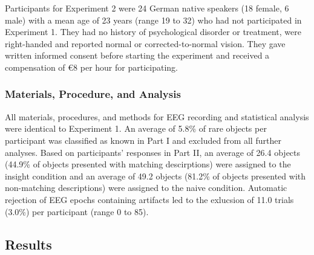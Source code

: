 \documentclass[
  english,
  man,11pt,floatsintext]{apa7}
\begin{document}
Participants for Experiment 2 were 24 German native speakers (18 female, 6 male) with a mean age of 23 years (range 19 to 32) who had not participated in Experiment 1. They had no history of psychological disorder or treatment, were right-handed and reported normal or corrected-to-normal vision. They gave written informed consent before starting the experiment and received a compensation of €8 per hour for participating.

\hypertarget{materials-procedure-and-analysis}{%
\subsubsection{Materials, Procedure, and Analysis}\label{materials-procedure-and-analysis}}

All materials, procedures, and methods for EEG recording and statistical analysis were identical to Experiment 1. An average of 5.8\% of rare objects per participant was classified as known in Part I and excluded from all further analyses. Based on participants' responses in Part II, an average of 26.4 objects (44.9\% of objects presented with matching descirptions) were assigned to the insight condition and an average of 49.2 objects (81.2\% of objects presented with non-matching descriptions) were assigned to the naive condition. Automatic rejection of EEG epochs containing artifacts led to the exlucsion of 11.0 trials (3.0\%) per participant (range 0 to 85).

\hypertarget{results-1}{%
\subsection{Results}\label{results-1}}
\end{document}
